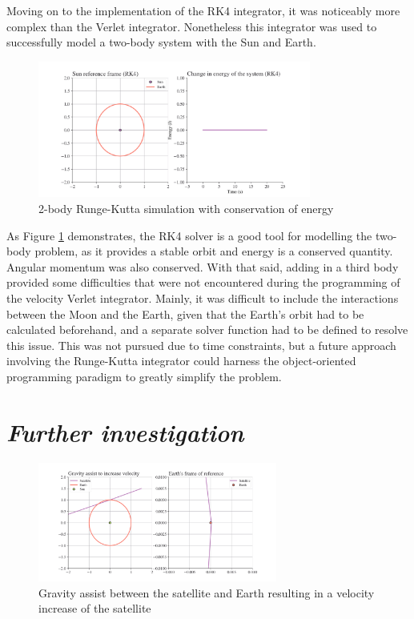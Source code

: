 \documentclass[11pt, english]{report}
\begin{document}
\normalsize{Moving on to the implementation of the RK4 integrator, it was noticeably more complex than the Verlet integrator. Nonetheless this integrator was used to successfully model a two-body system with the Sun and Earth.
\begin{figure}[ht]
    \centering
    \includegraphics[width=0.8\textwidth]{graphics/rk4.png}
    \caption{2-body Runge-Kutta simulation with conservation of energy}
    \label{fig:rk4}
\end{figure}
As Figure \ref{fig:rk4} demonstrates, the RK4 solver is a good tool for modelling the two-body problem, as it provides a stable orbit and energy is a conserved quantity. Angular momentum was also conserved. With that said, adding in a third body provided some difficulties that were not encountered during the programming of the velocity Verlet integrator. Mainly, it was difficult to include the interactions between the Moon and the Earth, given that the Earth's orbit had to be calculated beforehand, and a separate solver function had to be defined to resolve this issue. This was not pursued due to time constraints, but a future approach involving the Runge-Kutta integrator could harness the object-oriented programming paradigm to greatly simplify the problem.}

\section{\textsl{Further investigation}}

\begin{figure}[ht]
    \centering
    \includegraphics[width=0.7\textwidth]{graphics/earth_increase1.png}
    \caption{Gravity assist between the satellite and Earth resulting in a velocity increase of the satellite}
    \label{fig:earth_increase1.png}
\end{figure}
\end{document}
